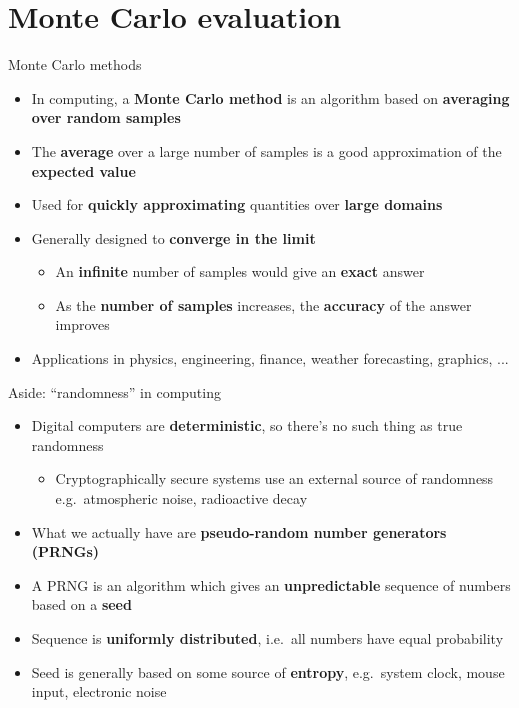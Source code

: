 \part{Monte Carlo evaluation}
\frame{\partpage}

\begin{frame}{Monte Carlo methods}
	\begin{itemize}
		\pause\item In computing, a \textbf{Monte Carlo method} is an algorithm based on \textbf{averaging over random samples}
		\pause\item The \textbf{average} over a large number of samples is a good approximation of the \textbf{expected value}
		\pause\item Used for \textbf{quickly approximating} quantities over \textbf{large domains}
		\pause\item Generally designed to \textbf{converge in the limit}
			\begin{itemize}
				\pause\item An \textbf{infinite} number of samples would give an \textbf{exact} answer
				\pause\item As the \textbf{number of samples} increases, the \textbf{accuracy} of the answer improves
			\end{itemize}
		\pause\item Applications in physics, engineering, finance, weather forecasting, graphics, ...
	\end{itemize}
\end{frame}

\begin{frame}{Aside: ``randomness'' in computing}
	\begin{itemize}
		\pause\item Digital computers are \textbf{deterministic}, so there's no such thing as true randomness
			\begin{itemize}
				\pause\item Cryptographically secure systems use an external source of randomness e.g.\ atmospheric noise, radioactive decay
			\end{itemize}
		\pause\item What we actually have are \textbf{pseudo-random number generators (PRNGs)}
		\pause\item A PRNG is an algorithm which gives an \textbf{unpredictable} sequence of numbers based on a \textbf{seed}
		\pause\item Sequence is \textbf{uniformly distributed}, i.e.\ all numbers have equal probability
		\pause\item Seed is generally based on some source of \textbf{entropy}, e.g.\ system clock, mouse input, electronic noise
	\end{itemize}
\end{frame}

